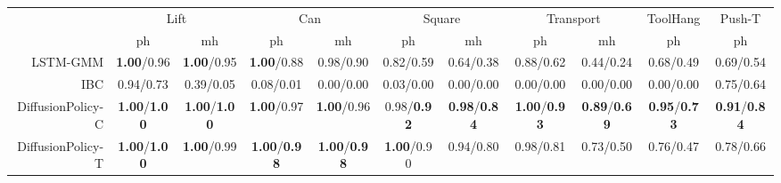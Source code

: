 \setlength\tabcolsep{ 3 pt}
\begin{tabular}{r|cc|cc|cc|cc|c|c}
\toprule
 & \multicolumn{2}{c|}{Lift} & \multicolumn{2}{c|}{Can} & \multicolumn{2}{c|}{Square} & \multicolumn{2}{c|}{Transport} & \multicolumn{1}{c|}{ToolHang} & \multicolumn{1}{c}{Push-T} \\
 & ph & mh & ph & mh & ph & mh & ph & mh & ph & ph \\
\midrule
LSTM-GMM & \small \textbf{1.00}/0.96 & \small \textbf{1.00}/0.95 & \small \textbf{1.00}/0.88 & \small 0.98/0.90 & \small 0.82/0.59 & \small 0.64/0.38 & \small 0.88/0.62 & \small 0.44/0.24 & \small 0.68/0.49 & \small 0.69/0.54 \\
IBC & \small 0.94/0.73 & \small 0.39/0.05 & \small 0.08/0.01 & \small 0.00/0.00 & \small 0.03/0.00 & \small 0.00/0.00 & \small 0.00/0.00 & \small 0.00/0.00 & \small 0.00/0.00 & \small 0.75/0.64 \\
DiffusionPolicy-C & \small \textbf{1.00}/\textbf{1.00} & \small \textbf{1.00}/\textbf{1.00} & \small \textbf{1.00}/0.97 & \small \textbf{1.00}/0.96 & \small 0.98/\textbf{0.92} & \small \textbf{0.98}/\textbf{0.84} & \small \textbf{1.00}/\textbf{0.93} & \small \textbf{0.89}/\textbf{0.69} & \small \textbf{0.95}/\textbf{0.73} & \small \textbf{0.91}/\textbf{0.84} \\
DiffusionPolicy-T & \small \textbf{1.00}/\textbf{1.00} & \small \textbf{1.00}/0.99 & \small \textbf{1.00}/\textbf{0.98} & \small \textbf{1.00}/\textbf{0.98} & \small \textbf{1.00}/0.90 & \small 0.94/0.80 & \small 0.98/0.81 & \small 0.73/0.50 & \small 0.76/0.47 & \small 0.78/0.66 \\
\bottomrule
\end{tabular}
